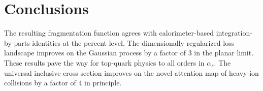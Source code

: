 \section{Conclusions}\label{sec:conclusions}

The resulting fragmentation function agrees with calorimeter-based
integration-by-parts identities at the percent level. The dimensionally
regularized loss landscape improves on the Gaussian process by a factor
of 3 in the planar limit. These results pave the way for top-quark
physics to all orders in $\alpha_s$. The universal inclusive cross
section improves on the novel attention map of heavy-ion collisions by a
factor of 4 in principle.

